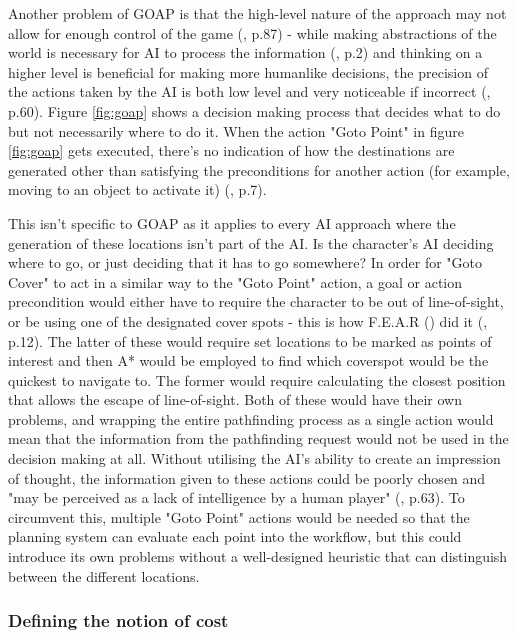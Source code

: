 \documentclass[11pt, a4paper]{article}
\begin{document}
Another problem of GOAP is that the high-level nature of the approach may not allow for enough control of the game (\cite{stanciu2012implementing}, p.87) - while making abstractions of the world is necessary for AI to process the information (\cite{buro2004call}, p.2) and thinking on a higher level is beneficial for making more humanlike decisions, the precision of the actions taken by the AI is both low level and very noticeable if incorrect (\cite{graham2003pathfinding}, p.60). Figure \ref{fig:goap} shows a decision making process that decides what to do but not necessarily where to do it. When the action "Goto Point" in figure \ref{fig:goap} gets executed, there's no indication of how the destinations are generated other than satisfying the preconditions for another action (for example, moving to an object to activate it) (\cite{orkin2003applying}, p.7). 

This isn't specific to GOAP as it applies to every AI approach where the generation of these locations isn't part of the AI. Is the character's AI deciding where to go, or just deciding that it has to go somewhere? In order for "Goto Cover" to act in a similar way to the "Goto Point" action, a goal or action precondition would either have to require the character to be out of line-of-sight, or be using one of the designated cover spots - this is how F.E.A.R (\citeyear{FEAR}) did it (\cite{orkin2006three}, p.12). The latter of these would require set locations to be marked as points of interest and then A* would be employed to find which coverspot would be the quickest to navigate to. The former would require calculating the closest position that allows the escape of line-of-sight. Both of these would have their own problems, and wrapping the entire pathfinding process as a single action would mean that the information from the pathfinding request would not be used in the decision making at all. Without utilising the AI's ability to create an impression of thought, the information given to these actions could be poorly chosen and "may be perceived as a lack of intelligence by a human player" (\cite{graham2003pathfinding}, p.63). To circumvent this, multiple "Goto Point" actions would be needed so that the planning system can evaluate each point into the workflow, but this could introduce its own problems without a well-designed heuristic that can distinguish between the different locations.

\subsubsection{Defining the notion of cost}
\end{document}
